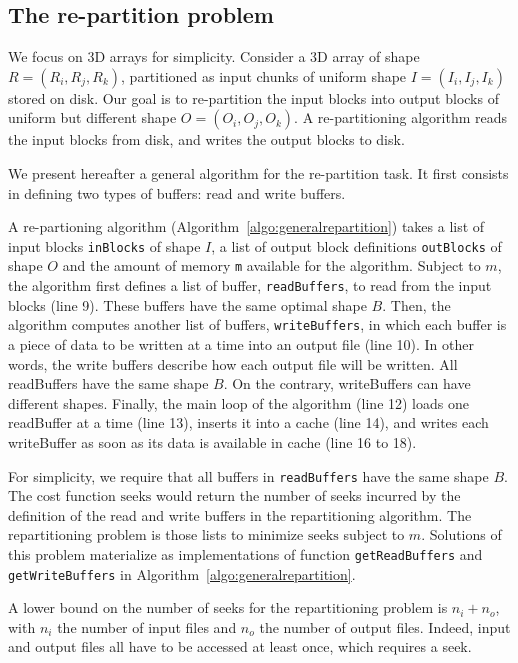 \documentclass[conference]{IEEEtran}
\begin{document}
\subsection{The re-partition problem}
We focus on 3D arrays for simplicity. Consider a 3D array of shape $R =
(R_i, R_j, R_k)$, partitioned as input chunks of uniform shape $I = (I_i,
I_j, I_k)$ stored on disk. Our goal is to re-partition the input blocks into
output blocks of uniform but different shape $O = (O_i, O_j, O_k)$.
A re-partitioning algorithm reads the input blocks from disk, and writes the
output blocks to disk.

We present hereafter a general algorithm for the re-partition task.
It first consists in defining two types of buffers: read and write buffers.

A re-partioning algorithm (Algorithm~\ref{algo:generalrepartition}) takes a
list of input blocks \texttt{inBlocks} of shape $I$, a list of output block
definitions \texttt{outBlocks} of shape $O$ and the amount of memory \texttt{m}
available for the algorithm.
Subject to $m$, the algorithm first defines a list of buffer,
\texttt{readBuffers}, to read from the input blocks (line 9).
These buffers have the same optimal shape $B$.
Then, the algorithm computes another list of buffers, \texttt{writeBuffers},
in which each buffer is a piece of data to be written at a time into an
output file (line 10).
In other words, the write buffers describe how each output file will be written.
All readBuffers have the same shape $B$. On the contrary, writeBuffers can
have different shapes.
Finally, the main loop of the algorithm (line 12) loads one readBuffer at a
time (line 13), inserts it into a cache (line 14), and writes each writeBuffer
as soon as its data is available in cache (line 16 to 18).

For simplicity, we require that all buffers in \texttt{readBuffers} have
the same shape $B$. The cost function $\mathrm{seeks}$ would return the number
of seeks incurred by the definition of the read and write buffers in the
repartitioning algorithm. The repartitioning problem is those lists to minimize
$\mathrm{seeks}$ subject to $m$. Solutions of this problem materialize as
implementations of function \texttt{getReadBuffers} and \texttt{getWriteBuffers} in
Algorithm~\ref{algo:generalrepartition}.

A lower bound on the number of seeks for the repartitioning problem is
$n_i + n_o$, with $n_i$ the number of input files and $n_o$ the number of output
files. Indeed, input and output files all have to be accessed at least once,
which requires a seek.
\end{document}
